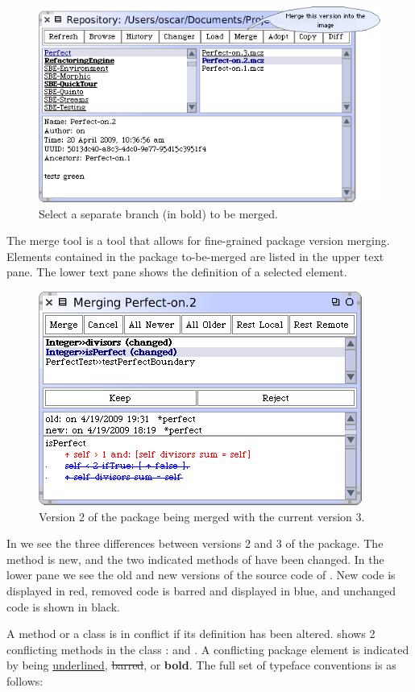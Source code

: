 \documentclass[a4paper,10pt,twoside]{book}
\begin{document}
\begin{figure}[ht]\centering
	\includegraphics[width=.60\textwidth]{mergeButton}
	\caption{Select a separate branch (in bold) to be merged.}
\end{figure}


The merge tool is a tool that allows for fine-grained package version merging. Elements contained in the package to-be-merged are listed in the upper text pane. The lower text pane shows the definition of a selected element. 

\begin{figure}[ht]\centering
	\includegraphics[width=.55\textwidth]{mergeTool}
	\caption{Version 2 of the  package being merged with the current version 3.
	}
\end{figure}

In  we see the three differences between versions 2 and 3 of the  package. The method  is new, and the two indicated methods of  have been changed. In the lower pane we see the old and new versions of the source code of .
New code is displayed in red, removed code is barred and displayed in blue, and unchanged code is shown in black. 

A method or a class is in conflict if its definition has been altered.  shows 2 conflicting methods in the class :  and . A conflicting package element is indicated by being \underline{underlined}, \sout{barred}, or {\bf bold}. The full set of typeface conventions is as follows:
\end{document}
